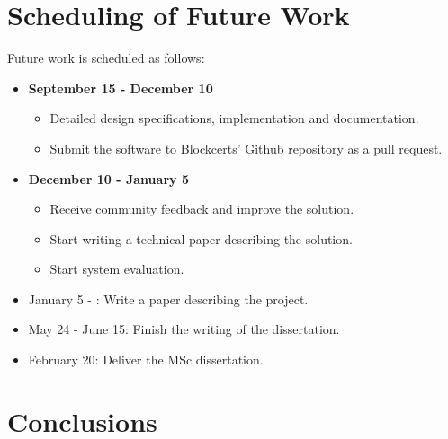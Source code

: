 \documentclass[llncsdoc]{llncs}
\begin{document}
\section{Scheduling of Future Work}
\label{sec:fwork}

Future work is scheduled as follows:

\begin{itemize}
\item \textbf{September 15 - December 10} 
    \begin{itemize}
        \item Detailed design specifications, implementation and documentation.
        \item Submit the software to Blockcerts' Github repository as a pull request.
    \end{itemize}
\item \textbf{December 10 - January 5}
    \begin{itemize}
        \item Receive community feedback and improve the solution. 
        \item Start writing a technical paper describing the solution. 
        \item Start system evaluation.
    \end{itemize}
\item January 5 - : Write a paper describing the project.
\item May 24 - June 15: Finish the writing of the dissertation.
\item February 20: Deliver the MSc dissertation.

\end{itemize}

\section{Conclusions}
\label{sec:conclusions}






\end{document}
